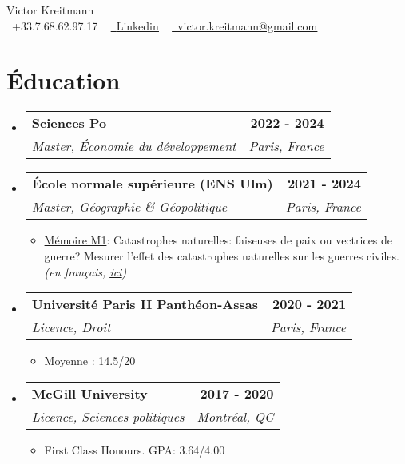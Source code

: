 \documentclass[a4paper,11pt]{article}
\makeatletter
\newcommand{\resumeItem}[1]{
  \item\small{
    {#1 \vspace{-2pt}}
  }
}
\newcommand{\resumeSubheading}[4]{
  \vspace{-2pt}\item
    \begin{tabular*}{1.00\textwidth}[t]{l@{\extracolsep{\fill}}r}
      \textbf{{\small #1}} & {\textbf{\small #2}} \\
      \textit{\small#3} & \textit{\small #4} \\
    \end{tabular*}\vspace{-7pt}
}
\newcommand{\resumeSubHeadingListStart}{\begin{itemize}[leftmargin=0.0in, label={}]}
\newcommand{\resumeSubHeadingListEnd}{\end{itemize}}
\newcommand{\resumeItemListStart}{\begin{itemize}}
\newcommand{\resumeItemListEnd}{\end{itemize}\vspace{-5pt}}
\makeatother
\begin{document}

\begin{center}
    {\Huge \upshape Victor Kreitmann} \\ \vspace{1pt}
    \small \raisebox{-0.1\height}\faPhone\ +33.7.68.62.97.17 ~
    \href{https://www.linkedin.com/in/victor-kreitmann/}{\raisebox{-0.2\height}\faLinkedin\ \underline{Linkedin}}  ~    
    \href{mailto:victor.kreitmann@gmail.com}{\raisebox{-0.2\height}\faEnvelope\  \underline{victor.kreitmann@gmail.com}} ~ 
    \vspace{0pt}
\end{center}




\section{Éducation}
  \resumeSubHeadingListStart
    \resumeSubheading
      {Sciences Po}{2022 - 2024}
      {Master, Économie du développement}{Paris, France}
      
      \resumeSubheading
      {École normale supérieure (ENS Ulm)}{2021 - 2024}
      {Master, Géographie \& Géopolitique}{Paris, France}
      \resumeItemListStart
      \resumeItem{\underline{Mémoire M1}: Catastrophes naturelles: faiseuses de paix ou vectrices de guerre? Mesurer l'effet des catastrophes naturelles sur les guerres civiles.\emph{(en français, \href{https://drive.google.com/file/d/1O6ke_2wZjExpSnBBnSKN7shPb0E3ZBgg/view?usp=sharing}{\underline{ici}})}}
      \resumeItemListEnd
      
      \resumeSubheading
      {Université Paris II Panthéon-Assas}{2020 - 2021}
      {Licence, Droit}{Paris, France}
      \resumeItemListStart
      \resumeItem{Moyenne : 14.5/20}
      \resumeItemListEnd
      
      \resumeSubheading
      {McGill University}{2017 - 2020}
      {Licence, Sciences politiques}{Montréal, QC}
      \resumeItemListStart
      \resumeItem{First Class Honours. GPA: 3.64/4.00}
      \resumeItemListEnd
  \resumeSubHeadingListEnd
\vspace{-10pt}
\end{document}
